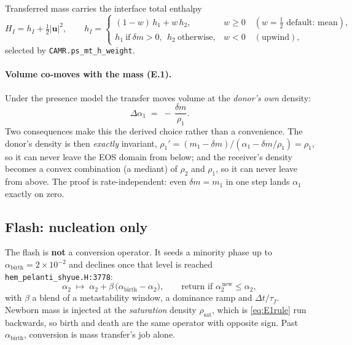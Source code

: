 \documentclass[11pt,a4paper]{article}
\newcommand{\uvec}{\mathbf{u}}
\newcommand{\code}[1]{\texttt{\small #1}}
\newcommand{\src}[1]{{\color{gray}\code{#1}}}
\begin{document}
Transferred mass carries the interface total enthalpy
\begin{equation}
  H_{\!I} = h_{\!I} + \tfrac12|\uvec|^2,
  \qquad
  h_{\!I} =
  \begin{cases}
    (1-w)\,h_1 + w\,h_2, & w \ge 0 \quad(w=\tfrac12 \text{ default: mean}),\\[2pt]
    h_1 \ \text{if}\ \delta m>0,\ \ h_2 \ \text{otherwise}, & w<0 \quad(\text{upwind}),
  \end{cases}
  \label{eq:carrier}
\end{equation}
selected by \code{CAMR.ps\_mt\_h\_weight}.

\paragraph{Volume co-moves with the mass (E.1).}
Under the presence model the transfer moves volume at the \emph{donor's own}
density:
\begin{equation}
  \Delta\alpha_1 \;=\; -\,\frac{\delta m}{\rho_1}.
  \label{eq:E1rule}
\end{equation}
Two consequences make this the derived choice rather than a convenience.  The
donor's density is then \emph{exactly} invariant,
$\rho_1' = (m_1-\delta m)/(\alpha_1-\delta m/\rho_1) = \rho_1$, so it can never
leave the EOS domain from below; and the receiver's density becomes a convex
combination (a mediant) of $\rho_2$ and $\rho_1$, so it can never leave from
above.  The proof is rate-independent: even $\delta m = m_1$ in one step lands
$\alpha_1$ exactly on zero.

\subsection{Flash: nucleation only}

The flash is \textbf{not} a conversion operator.  It seeds a minority phase up
to $\alpha_{\mathrm{birth}} = 2\times10^{-2}$ and declines once that level is
reached \src{hem\_pelanti\_shyue.H:3778}:
\begin{equation}
  \alpha_2 \;\mapsto\; \alpha_2 + \beta\,\bigl(\alpha_{\mathrm{birth}}-\alpha_2\bigr),
  \qquad
  \text{return if } \alpha_2^{\,\mathrm{new}} \le \alpha_2 ,
\end{equation}
with $\beta$ a blend of a metastability window, a dominance ramp and
$\Delta t/\tau_f$.  Newborn mass is injected at the \emph{saturation} density
$\rho_{\mathrm{sat}}$, which is \eqref{eq:E1rule} run backwards, so birth and
death are the same operator with opposite sign.  Past
$\alpha_{\mathrm{birth}}$, conversion is mass transfer's job alone.
\end{document}
